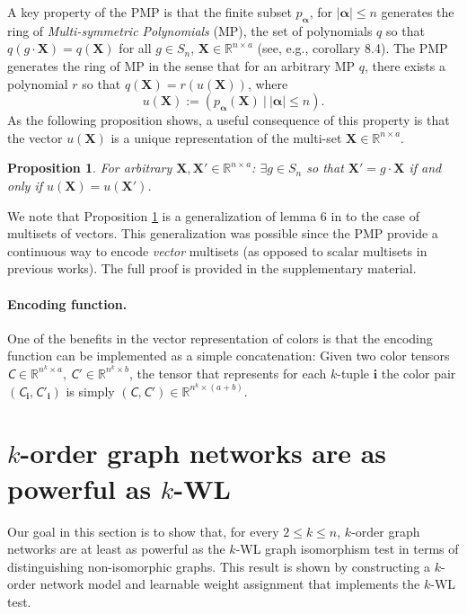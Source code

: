\documentclass{article}
\newcommand{\abs}[1]{\left\vert#1\right\vert}
\newcommand{\parr}[1]{\left (#1\right )}
\newcommand{\Real}{\mathbb R}
\newtheorem{proposition}{Proposition}
\newcommand{\eg}{{e.g.}}
\newcommand{\revision}[1]{{\color{black} #1}}
\def\vi{{\bm{i}}}
\def\valpha{{\bm{\alpha}}}
\def\mX{{\bm{X}}}
\newcommand{\tens}[1]{\bm{\mathsfit{#1}}}
\def\tC{{\tens{C}}}
\begin{document}
A key property of the PMP is that the finite subset $p_\valpha$, for $\abs{\valpha}\leq n$ generates the ring of \emph{Multi-symmetric Polynomials} (MP), the set of polynomials $q$ so that $q(g\cdot \mX)=q(\mX)$ for all $g\in S_n$, $\mX\in\Real^{n\times a}$ (see, \eg,  \citep{rydh2007minimal} corollary 8.4). The PMP generates the ring of MP in the sense that for an arbitrary MP $q$, there exists a polynomial $r$ so that $q(\mX)=r\parr{u(\mX)}$, where
\begin{equation}\label{e:u}
    u(\mX):=\parr{p_{\valpha}(\mX) \ \big\vert \ \abs{\valpha}\leq n}.
\end{equation}
As the following proposition shows, a useful consequence of this property is that the vector $u(\mX)$ is a unique representation of the multi-set $\mX\in\Real^{n\times a}$. 
\begin{proposition}\label{prop:u}
For arbitrary $\mX,\mX' \in \Real^{n\times a}$: $\exists g\in S_n$ so that $\mX'=g\cdot \mX$ if and only if $u(\mX)=u(\mX')$. 
\end{proposition}
We note that Proposition \ref{prop:u} is a generalization of lemma 6 in \citet{zaheer2017deep} to the case of multisets of vectors. \revision{This generalization was possible since the PMP  provide a continuous way to encode \textit{vector} multisets (as opposed to scalar multisets in previous works). } The full proof is provided in the supplementary material.

\paragraph{Encoding function.} One of the benefits in the vector representation of colors is that the encoding function can be implemented as a simple concatenation: Given two color tensors $\tC\in\Real^{n^k\times a}$, $\tC'\in \Real^{n^k\times b}$, the tensor that represents for each $k$-tuple $\vi$ the color pair $(\tC_\vi, \tC'_\vi)$ is simply $(\tC,\tC')\in\Real^{n^k\times(a+b)}$.  






\section{$k$-order graph networks are as powerful as $k$-WL}\label{s:as_powerful}
Our goal in this section is to show that, for every $2\leq k \leq n$, $k$-order graph networks \citep{maron2018invariant} are at least as powerful as the $k$-WL graph isomorphism test in terms of distinguishing non-isomorphic graphs. This result is shown by constructing a $k$-order network model and learnable weight assignment that implements the $k$-WL test. 
\end{document}
